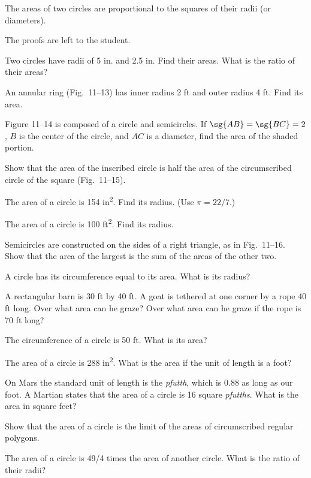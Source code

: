 \documentclass[11pt]{book}
\theoremstyle{bkplain}
\theoremstyle{XIplainnote}
\theoremstyle{bkplain}
\theoremstyle{bkplain}
\begin{document}
\begin{corollary}
The areas of two circles are proportional to the squares of their radii (or
diameters).
\end{corollary}

\noindent The proofs are left to the student.

\begin{exercisecols}
\begin{exlist}
\item Two circles have radii of 5 in. and 2.5 in. Find their areas. What is the
      ratio of their areas?
\item An annular ring (Fig.~11--13) has inner radius 2 ft and outer radius
      4 ft. Find its area.
\exfig{\FIGXITHIRTEEN}
\item Figure 11--14 is composed of a circle and semicircles. If
      $\sg{AB} = \sg{BC} = 2$, $B$ is the center of the circle, and $AC$ is a
      diameter, find the area of the shaded portion.
\exfig{\FIGXIFOURTEEN}
\item Show that the area of the inscribed circle is half the area of the
      circumscribed circle of the square (Fig.~11--15).
\exfig{\FIGXIFIFTEEN}
\item The area of a circle is 154 in\textsuperscript{2}. Find its radius.
      (Use $\pi = 22/7$.)
\item The area of a circle is 100 ft\textsuperscript{2}. Find its radius.
\item Semicircles are constructed on the sides of a right triangle, as in
      Fig.~11--16. Show that the area of the largest is the sum of the areas of
      the other two.
\exfig{\FIGXISIXTEEN}
\item A circle has its circumference equal to its area. What is its radius?
\item A rectangular barn is 30 ft by 40 ft. A goat is tethered at one corner by
      a rope 40 ft long. Over what area can he graze? Over what area can he
      graze if the rope is 70 ft long?
\item The circumference of a circle is 50 ft. What is its area?
\item The area of a circle is 288 in\textsuperscript{2}. What is the area if
      the unit of length is a foot?
\item On Mars the standard unit of length is the \emph{pfutth}, which is 0.88
      as long as our foot. A Martian states that the area of a circle is 16
      square \emph{pfutths}. What is the area in square feet?
\item[\stex 13.] Show that the area of a circle is the limit of the areas of
      circumscribed regular polygons.
\item[14.] The area of a circle is 49/4 times the area of another circle. What
      is the ratio of their radii?
\end{exlist}
\end{exercisecols}
\end{document}
